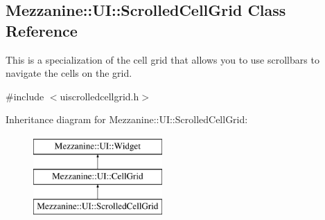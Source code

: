 \hypertarget{classMezzanine_1_1UI_1_1ScrolledCellGrid}{
\subsection{Mezzanine::UI::ScrolledCellGrid Class Reference}
\label{classMezzanine_1_1UI_1_1ScrolledCellGrid}
}


This is a specialization of the cell grid that allows you to use scrollbars to navigate the cells on the grid.  




{\ttfamily \#include $<$uiscrolledcellgrid.h$>$}

Inheritance diagram for Mezzanine::UI::ScrolledCellGrid:\begin{figure}[H]
\begin{center}
\leavevmode
\includegraphics[height=3.000000cm]{classMezzanine_1_1UI_1_1ScrolledCellGrid}
\end{center}
\end{figure}

